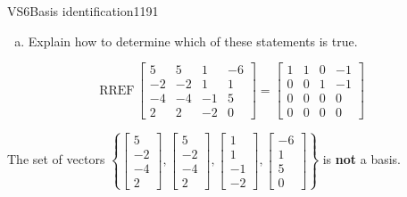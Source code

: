 \begin{exercise}{VS6}{Basis identification}{1191}
\begin{exerciseStatement}
\begin{enumerate}[(a)]
\begin{itemize}
 
\end{itemize}

     
\item  

 Explain how to determine which of these statements is true. 

 
\end{enumerate}

     \end{exerciseStatement}
 \begin{exerciseAnswer} 

 \[
\mathrm{RREF}\, \left[\begin{array}{cccc}
5 & 5 & 1 & -6 \\
-2 & -2 & 1 & 1 \\
-4 & -4 & -1 & 5 \\
2 & 2 & -2 & 0
\end{array}\right] = \left[\begin{array}{cccc}
1 & 1 & 0 & -1 \\
0 & 0 & 1 & -1 \\
0 & 0 & 0 & 0 \\
0 & 0 & 0 & 0
\end{array}\right]
            \] 

 

 The set of vectors \(\left\{ \left[\begin{array}{c}
5 \\
-2 \\
-4 \\
2
\end{array}\right] , \left[\begin{array}{c}
5 \\
-2 \\
-4 \\
2
\end{array}\right] , \left[\begin{array}{c}
1 \\
1 \\
-1 \\
-2
\end{array}\right] , \left[\begin{array}{c}
-6 \\
1 \\
5 \\
0
\end{array}\right] \right\}\) is \textbf{not} a basis. 

 \end{exerciseAnswer}
 \end{exercise}


